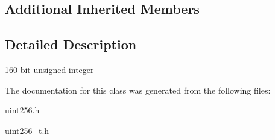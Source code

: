 \subsection*{Additional Inherited Members}


\subsection{Detailed Description}
160-\/bit unsigned integer 

The documentation for this class was generated from the following files\+:\begin{DoxyCompactItemize}
\item 
uint256.\+h\item 
uint256\+\_\+t.\+h\end{DoxyCompactItemize}
